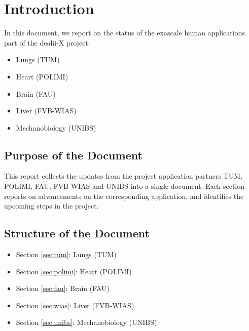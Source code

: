 \documentclass[a4paper,12pt]{article}
\begin{document}
\vspace*{2cm}

\disclaimer

\newpage

\tableofcontents %

\newpage

\section{{Introduction}}

In this document, we report on the status of the exascale human applications part of the dealii-X project:
\begin{itemize}
    \item Lungs (TUM)
    \item Heart (POLIMI)
    \item Brain (FAU)
    \item Liver (FVB-WIAS)
    \item Mechanobiology (UNIBS)
\end{itemize}

\subsection{{Purpose of the Document}}

This report collects the updates from the project application partners TUM, POLIMI, FAU, FVB-WIAS and UNIBS into a single document. Each section reports on advancements on the corresponding application, and identifies the upcoming steps in the project.

\subsection{{Structure of the Document}}
\begin{itemize}
    \item Section \ref{sec:tum}: Lungs (TUM)
    \item Section \ref{sec:polimi}: Heart (POLIMI)
    \item Section \ref{sec:fau}: Brain (FAU)
    \item Section \ref{sec:wias}: Liver (FVB-WIAS)
    \item Section \ref{sec:unibs}: Mechanobiology (UNIBS)
\end{itemize}
\end{document}
